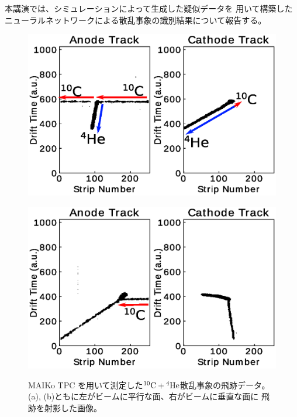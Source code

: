 \documentclass[12pt,a4paper]{jsarticle}
\begin{document}
本講演では、シミュレーションによって生成した疑似データを
用いて構築したニューラルネットワークによる散乱事象の識別結果について報告する。

\begin{figure}[h]
  \begin{minipage}{0.5\hsize}
    \begin{center}
      \includegraphics[clip,width=0.8\columnwidth]{true.eps}
    \end{center}
    \vspace*{-1\intextsep}
    \label{fig:true}
  \end{minipage}
  \begin{minipage}{0.5\hsize}
    \begin{center}
      \includegraphics[clip,width=0.8\columnwidth]{false.eps}
    \end{center}
    \vspace*{-1\intextsep}
    \label{fig:false}
  \end{minipage}
  \vspace*{-0.7\intextsep}
  \caption{\small
    MAIKo TPC を用いて測定した${}^{10}\rm{C} + {}^{4}\rm{He}$散乱事象の飛跡データ。
    (a), (b)ともに左がビームに平行な面、右がビームに垂直な面に
    飛跡を射影した画像。
  }
\end{figure}
\end{document}
